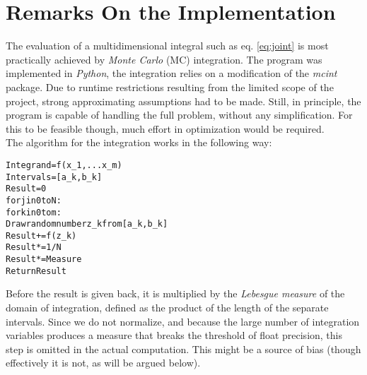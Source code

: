 \documentclass[aps,prb,twocolumn,showpacs,superscriptaddress,groupedaddress]{revtex4}  %
\begin{document}
\section{Remarks On the Implementation}
The evaluation of a multidimensional integral such as eq. \ref{eq:joint} is most practically achieved by \emph{Monte Carlo} (MC) integration. The program was implemented in \emph{Python}, the integration relies on a modification of the \emph{mcint}\cite{mcint} package. Due to runtime restrictions resulting from the limited scope of the project, strong approximating assumptions had to be made. Still, in principle, the program is capable of handling the full problem, without any simplification. For this to be feasible though, much effort in optimization would be required.\\
The algorithm for the integration works in the following way:
\begin{alltt}
Integrand=f(x_{1},...x_{m})
Intervals=[a_{k},b_{k}]
Result=0
for j in 0 to N:
    for k in 0 to m:
        Draw random number z_{k} from [a_{k},b_{k}]
    Result+=f(z_{k})
Result*=1/N
Result*=Measure
Return Result
\end{alltt}
Before the result is given back, it is multiplied by the \emph{Lebesgue measure} of the domain of integration, defined as the product of the length of the separate intervals. Since we do not normalize, and because the large number of integration variables produces a measure that breaks the threshold of float precision, this step is omitted in the actual computation. This might be a source of bias (though effectively it is not, as will be argued below).\\
\end{document}
